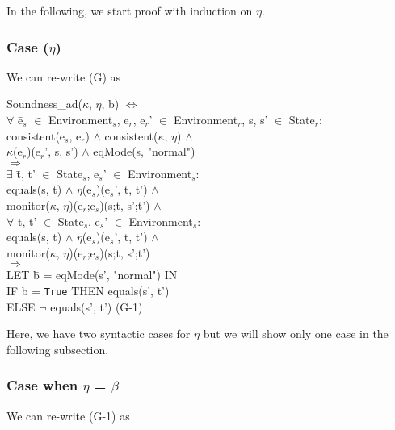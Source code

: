 \documentclass[conference]{IEEEtran}
\begin{document}
In the following, we start proof with induction on $\eta$.

\subsubsection{Case ($\eta$)}

We can re-write (G) as 

\begin{tabbing}
Soundness\_ad($\kappa$, $\eta$, b) $\Leftrightarrow$
\\$\forall$ \=e$_s$ $\in$ Environment$_s$, e$_r$, e$_r$' $\in$ Environment$_r$, s, s' $\in$ State$_r$:
\\\>consistent(e$_s$, e$_r$) $\wedge$ consistent($\kappa$, $\eta$) $\wedge$ 
\\\>\textlbrackdbl $\kappa$\textrbrackdbl(e$_r$)(e$_r$', s, s') $\wedge$ eqMode(s, "normal")
\\$\Rightarrow$
\\\>$\exists$ \=t, t' $\in$ State$_s$, e$_s$' $\in$ Environment$_s$: 
\\\>\>equals(s, t) $\wedge$ \textlbrackdbl $\eta$\textrbrackdbl(e$_s$)(e$_s$', t, t') $\wedge$ 
\\\>\> monitor($\kappa$, $\eta$)(e$_r$;e$_s$)(s;t, s';t')
$\wedge$
\\\>$\forall$ \=t, t' $\in$ State$_s$, e$_s$' $\in$ Environment$_s$: 
\\\>\>equals(s, t) $\wedge$ \textlbrackdbl $\eta$\textrbrackdbl(e$_s$)(e$_s$', t, t') $\wedge$ 
\\\>\> monitor($\kappa$, $\eta$)(e$_r$;e$_s$)(s;t, s';t')
\\\>$\Rightarrow$ \=
\\\> LET \=b = eqMode(s', "normal") IN
\\\>\>IF b = \texttt{True} THEN equals(s', t') 
\\\>\> ELSE $\neg$ equals(s', t')   \hspace*{2cm} (G-1)
\end{tabbing}

Here, we have two syntactic cases for $\eta$ but we will show only one case in the following subsection.

\subsubsection{Case when $\eta$ = $\beta$}

\noindent We can re-write (G-1) as
\end{document}
